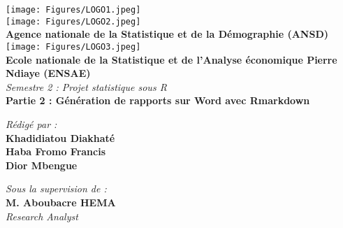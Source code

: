 \documentclass[
]{article}
\author{}
\date{\vspace{-2.5em}}
\begin{document}
\begin{titlepage}
    \begin{center}
        \texttt{[image: Figures/LOGO1.jpeg]} \\[0.1cm]
        \texttt{[image: Figures/LOGO2.jpeg]} \\[0.1cm]
        
        \textbf{\large Agence nationale de la Statistique et de la Démographie (ANSD)}\\[0.2cm]
        
        \texttt{[image: Figures/LOGO3.jpeg]} \\[0.1cm]
        
        \textbf{\large Ecole nationale de la Statistique et de l'Analyse économique Pierre Ndiaye (ENSAE)}\\[0.4cm]
        
        \textit{\LARGE Semestre 2 : Projet statistique sous R }\\[0.3cm]
        \textbf{\Huge \color{blue} \textsf{Partie 2 : Génération de rapports sur Word avec Rmarkdown}}\\[0.2cm]
        
        \begin{minipage}{0.5\textwidth}
    \begin{flushleft} \large
        \emph{\textsf{Rédigé par :}}\\
        \textbf{Khadidiatou Diakhaté}\\
        \textbf{Haba Fromo Francis}\\
        \textbf{Dior Mbengue}\\
    \end{flushleft}
\end{minipage}
        \hfill
        \begin{minipage}{0.4\textwidth}
            \begin{flushright} \large
                \emph{\textsf{Sous la supervision de :}} \\
                \textbf{M. Aboubacre HEMA}\\
                \textit{Research Analyst }
            \end{flushright}
        \end{minipage}


\end{center}
\end{titlepage}
\end{document}
